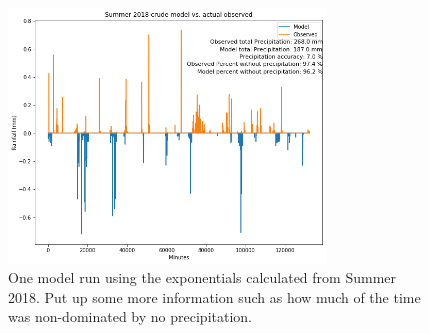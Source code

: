 \documentclass[11pt]{report}
\begin{document}
\clearpage
\begin{figure}[t]
	\centering
	\includegraphics[width=0.75\textwidth]{Figures/run_with_more_info.png}
	\caption[More  run using Summer 2018 climatology]
	{\label{crudesmodel} One model run using the exponentials calculated from Summer 2018. Put up some more information such as how much of the time was non-dominated by no precipitation. }
\end{figure}
\end{document}
